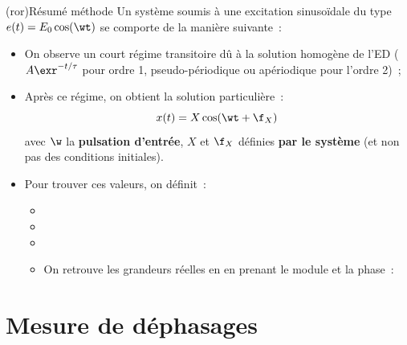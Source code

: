\documentclass[../../main/main.tex]{subfiles}
\begin{document}
\begin{tcb}(ror){Résumé méthode}
	Un système soumis à une excitation sinusoïdale du type $e(t) = E_0\cos(\wt)$
	se comporte de la manière suivante~:
	\begin{itemize}
		\item On observe un court régime transitoire dû à la solution homogène de
		      l'ED ($A\exr^{-t/\tau}$ pour ordre 1, pseudo-périodique ou apériodique
		      pour l'ordre 2)~;
		\item Après ce régime, on obtient la solution particulière~:
		      \[
			      x(t) = X\cos(\wt+\f_X)
		      \]
		      avec $\w$ la \textbf{pulsation d'entrée}, $X$ et $\f_X$  définies
		      \textbf{par le système} (et non pas des conditions initiales).
		\item Pour trouver ces valeurs, on définit~:
		      \begin{itemize}
			      \item {}
			            {}
			            \vspace{-10pt}
			      \item {}
			            {}
			            \vspace{-10pt}
			      \item {}
			            {}
			            \vspace{-5pt}
			      \item On retrouve les grandeurs réelles en en prenant le module et
			            la phase~:
			            \psw{
				            \[
					            \boxed{X = \abs{\xul{X}}}
					            \qet
					            \boxed{\f_X = \arg*{\xul{X}}}
				            \]
			            }
			            \vspace{-15pt}
		      \end{itemize}
	\end{itemize}
\end{tcb}

\section{Mesure de déphasages}
\end{document}
